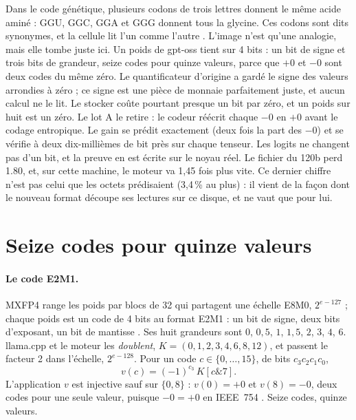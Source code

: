\begin{enbref}
Dans le code génétique, plusieurs codons de trois lettres donnent le même acide aminé : GGU, GGC, GGA et GGG donnent tous la glycine. Ces codons sont dits synonymes, et la cellule lit l'un comme l'autre \parencite{genome-crick1968,genome-pe-crick1966wobble}. L'image n'est qu'une analogie, mais elle tombe juste ici. Un poids de gpt-oss tient sur 4 bits : un bit de signe et trois bits de grandeur, seize codes pour quinze valeurs, parce que $+0$ et $-0$ sont deux codes du même zéro. Le quantificateur d'origine a gardé le signe des valeurs arrondies à zéro ; ce signe est une pièce de monnaie parfaitement juste, et aucun calcul ne le lit. Le stocker coûte pourtant presque un bit par zéro, et un poids sur huit est un zéro. Le lot A le retire : le codeur réécrit chaque $-0$ en $+0$ avant le codage entropique. Le gain se prédit exactement (deux fois la part des $-0$) et se vérifie à deux dix-millièmes de bit près sur chaque tenseur. Les logits ne changent pas d'un bit, et la preuve en est écrite sur le noyau réel. Le fichier du 120b perd \SI{1.80}{\Go}, et, sur cette machine, le moteur va 1,45 fois plus vite. Ce dernier chiffre n'est pas celui que les octets prédisaient (3,4\,\% au plus) : il vient de la façon dont le nouveau format découpe ses lectures sur ce disque, et ne vaut que pour lui.
\end{enbref}

\section{Seize codes pour quinze valeurs}\label{t3cod:sec:codes}

\paragraph{Le code E2M1.} MXFP4 range les poids par blocs de 32 qui partagent une échelle E8M0, $2^{e - 127}$ ; chaque poids est un code de 4 bits au format E2M1 : un bit de signe, deux bits d'exposant, un bit de mantisse \parencite{ocpmx2023,rouhani2023microscaling}. Ses huit grandeurs sont $0$, $0{,}5$, $1$, $1{,}5$, $2$, $3$, $4$, $6$. llama.cpp et le moteur les \emph{doublent}, $K = (0, 1, 2, 3, 4, 6, 8, 12)$, et passent le facteur 2 dans l'échelle, $2^{e - 128}$. Pour un code $c \in \{0, \dots, 15\}$, de bits $c_3 c_2 c_1 c_0$,
\begin{equation}\label{t3cod:eq:valeur}
v(c) = (-1)^{c_3}\, K[c \mathbin{\&} 7].
\end{equation}
L'application $v$ est injective sauf sur $\{0, 8\}$ : $v(0) = +0$ et $v(8) = -0$, deux codes pour une seule valeur, puisque $-0 = +0$ en IEEE~754 \parencite{ieee754}. Seize codes, quinze valeurs.

